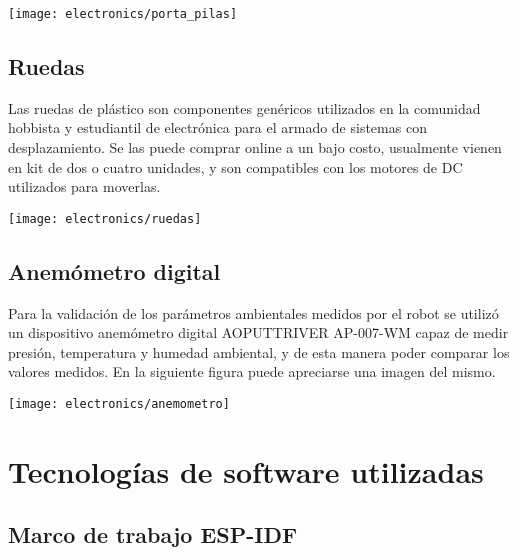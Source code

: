 \begin{center}
  \centering
  \texttt{[image: electronics/porta\_pilas]}
  \label{fig:porta_pilas}
\end{center}

\subsection{Ruedas}

Las ruedas de plástico son componentes genéricos utilizados en la comunidad hobbista y estudiantil de electrónica para el armado de sistemas con desplazamiento. Se las puede comprar online a un bajo costo, usualmente vienen en kit de dos o cuatro unidades, y son compatibles con los motores de DC utilizados para moverlas.

\begin{center}
  \centering
  \texttt{[image: electronics/ruedas]}
  \label{fig:ruedas}
\end{center}

\subsection{Anemómetro digital}

Para la validación de los parámetros ambientales medidos por el robot se utilizó un dispositivo anemómetro digital AOPUTTRIVER AP-007-WM \cite{AOPUTTRIVER_Datasheet} capaz de medir presión, temperatura y humedad ambiental, y de esta manera poder comparar los valores medidos. En la siguiente figura puede apreciarse una imagen del mismo.

\begin{center}
\texttt{[image: electronics/anemometro]}
  \label{fig:anemometro}
\end{center}


\section{Tecnologías de software utilizadas}

\subsection{Marco de trabajo ESP-IDF}

